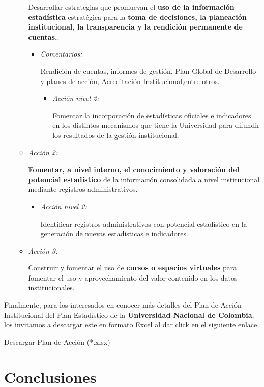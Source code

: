 \documentclass[
]{book}
\begin{document}
\begin{itemize}
\begin{itemize}
    Desarrollar estrategias que promuevan el \textbf{uso de la información estadística} estratégica para la \textbf{toma de decisiones, la planeación institucional, la transparencia y la rendición permanente de cuentas.}.

    \begin{itemize}
    \item
      \emph{Comentarios:}

      Rendición de cuentas, informes de gestión, Plan Global de Desarrollo y planes de acción, Acreditación Institucional,entre otros.

      \begin{itemize}
      \item
        \emph{Acción nivel 2:}

        Fomentar la incorporación de estadísticas oficiales e indicadores en los distintos mecanismos que tiene la Universidad para difundir los resultados de la gestión institucional.
      \end{itemize}
    \end{itemize}
  \item
    \emph{Acción 2:}

    \textbf{Fomentar, a nivel interno, el conocimiento y valoración del potencial estadístico} de la información consolidada a nivel institucional mediante registros administrativos.

    \begin{itemize}
    \item
      \emph{Acción nivel 2:}

      Identificar registros administrativos con potencial estadístico en la generación de nuevas estadísticas e indicadores.
    \end{itemize}
  \item
    \emph{Acción 3:}

    Construir y fomentar el uso de \textbf{cursos o espacios virtuales} para fomentar el uso y aprovechamiento del valor contenido en los datos institucionales.
  \end{itemize}
\end{itemize}

Finalmente, para los interesados en conocer más detalles del Plan de Acción Institucional del Plan Estadístico de la \textbf{Universidad Nacional de Colombia}, los invitamos a descargar este en formato Excel al dar click en el siguiente enlace.

Descargar Plan de Acción (*.xlsx)

\hypertarget{conclusiones}{%
\chapter{Conclusiones}\label{conclusiones}}
\end{document}
